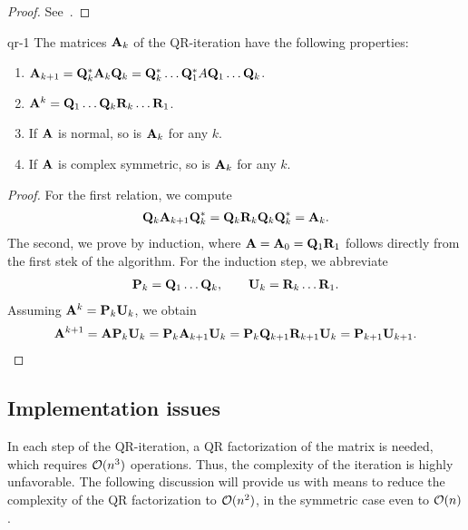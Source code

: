 \begin{proof}
  See~\cite[Theorem 7.3-1]{GolubVanLoan83}.
\end{proof}

\begin{Lemma}{qr-1}
  The matrices $\mathbf A_k$ of the QR-iteration have the following properties:
  \begin{enumerate}
  \item $\mathbf A_{k+1} = \mathbf Q_k^*\mathbf A_k\mathbf Q_k = \mathbf Q_k^*\dots\mathbf Q_1^*A\mathbf Q_1\dots\mathbf Q_k$.
  \item $\mathbf A^k=\mathbf Q_1\dots\mathbf Q_k\mathbf R_k\dots\mathbf R_1$.
  \item If $\mathbf A$ is normal, so is $\mathbf A_k$ for any $k$.
  \item If $\mathbf A$ is complex symmetric, so is $\mathbf A_k$ for any $k$.
  \end{enumerate}
\end{Lemma}

\begin{proof}
  For the first relation, we compute
  \begin{gather}
    \mathbf Q_k\mathbf A_{k+1}\mathbf Q_k^* = \mathbf Q_k\mathbf R_k\mathbf Q_k\mathbf Q_k^* = \mathbf A_k.
  \end{gather}
  The second, we prove by induction, where
  $\mathbf A = \mathbf A_0 = \mathbf Q_1\mathbf R_1$ follows directly from the first
  stek of the algorithm. For the induction step, we abbreviate
  \begin{gather}
    \mathbf P_k = \mathbf Q_1\dots\mathbf Q_k,\qquad \mathbf U_k = \mathbf R_k\dots\mathbf R_1.
  \end{gather}
  Assuming $\mathbf A^k = \mathbf P_k\mathbf U_k$, we obtain
  \begin{gather}
    \mathbf A^{k+1} = \mathbf A\mathbf P_k\mathbf U_k = \mathbf P_k\mathbf A_{k+1}\mathbf U_k
    = \mathbf P_k\mathbf Q_{k+1}\mathbf R_{k+1}\mathbf U_k = \mathbf P_{k+1}\mathbf U_{k+1}.
  \end{gather}
\end{proof}
\subsection{Implementation issues}
\begin{intro}
  In each step of the QR-iteration, a QR factorization of the matrix
  is needed, which requires $\mathcal O(n^3)$ operations. Thus, the
  complexity of the iteration is highly unfavorable. The following
  discussion will provide us with means to reduce the complexity of
  the QR factorization to $\mathcal O(n^2)$, in the symmetric case even to
  $\mathcal O(n)$.
\end{intro}

